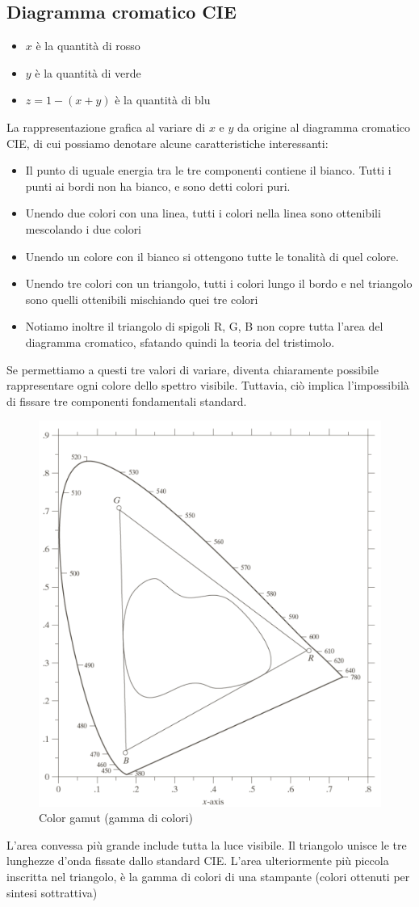 \documentclass{report}
\begin{document}
	\subsection{Diagramma cromatico CIE}
	\begin{itemize}
		\item $x$ è la quantità di rosso
		\item $y$ è la quantità di verde
		\item $z = 1-(x+y)$ è la quantità di blu
	\end{itemize}
	La rappresentazione grafica al variare di $x$ e $y$ da origine al diagramma cromatico CIE, di cui possiamo denotare alcune caratteristiche interessanti:
	\begin{itemize}
		\item Il punto di uguale energia tra le tre componenti contiene il bianco. Tutti i punti ai bordi non ha bianco, e sono detti colori puri.
		\item Unendo due colori con una linea, tutti i colori nella linea sono ottenibili mescolando i due colori
		\item Unendo un colore con il bianco si ottengono tutte le tonalità di quel colore.
		\item Unendo tre colori con un triangolo, tutti i colori lungo il bordo e nel triangolo sono quelli ottenibili mischiando quei tre colori
		\item Notiamo inoltre il triangolo di spigoli R, G, B non copre tutta l'area del diagramma cromatico, sfatando quindi la teoria del tristimolo.
	\end{itemize}
	Se permettiamo a questi tre valori di variare, diventa chiaramente possibile rappresentare ogni colore dello spettro visibile. Tuttavia, ciò implica l'impossibilà di fissare tre componenti fondamentali standard.
	
	\begin{figure}[htp]
		\centering
		\includegraphics[width=0.3\linewidth]{gamut.png}
		\caption{Color gamut (gamma di colori)}
	\end{figure}
	L'area convessa più grande include tutta la luce visibile. Il triangolo unisce le tre lunghezze d'onda fissate dallo standard CIE. L'area ulteriormente più piccola inscritta nel triangolo, è la gamma di colori di una stampante (colori ottenuti per sintesi sottrattiva)
	\newpage
\end{document}
